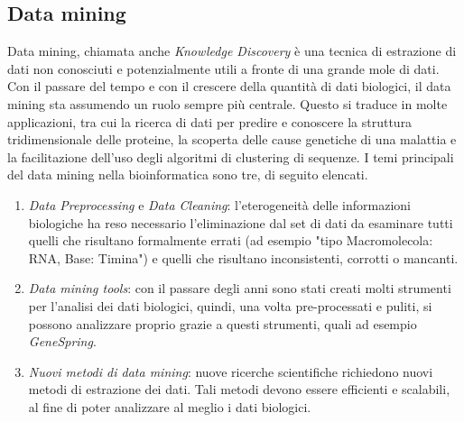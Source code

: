 \subsection{Data mining}
Data mining, chiamata anche \textit{Knowledge Discovery} è una tecnica di estrazione di dati non conosciuti e potenzialmente utili a fronte di una grande mole di dati. Con il passare del tempo e con il crescere della quantità di dati biologici, il data mining sta assumendo un ruolo sempre più centrale. Questo si traduce in molte applicazioni, tra cui la ricerca di dati per predire e conoscere la struttura tridimensionale delle proteine, la scoperta delle cause genetiche di una malattia e la facilitazione dell'uso degli algoritmi di clustering di sequenze.
\newline
I temi principali del data mining nella bioinformatica sono tre, di seguito elencati.
\begin{enumerate}
	\item \textit{Data Preprocessing} e \textit{Data Cleaning}: l'eterogeneità delle informazioni biologiche ha reso necessario l'eliminazione dal set di dati da esaminare tutti quelli che risultano formalmente errati (ad esempio "tipo Macromolecola: RNA, Base: Timina") e quelli che risultano inconsistenti, corrotti o mancanti.
	\item \textit{Data mining tools}: con il passare degli anni sono stati creati molti strumenti per l'analisi dei dati biologici, quindi, una volta pre-processati e puliti, si possono analizzare proprio grazie a questi strumenti, quali ad esempio \textit{GeneSpring}.
	\item \textit{Nuovi metodi di data mining}: nuove ricerche scientifiche richiedono nuovi metodi di estrazione dei dati. Tali metodi devono essere efficienti e scalabili, al fine di poter analizzare al meglio i dati biologici.
\end{enumerate}


